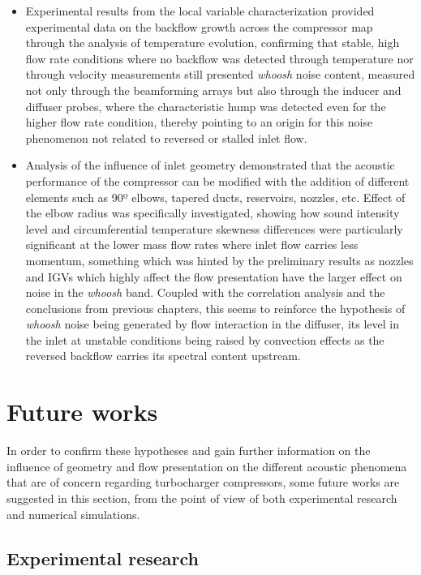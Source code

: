 \begin{itemize}
	\item Experimental results from the local variable characterization provided experimental data on the backflow growth across the compressor map through the analysis of temperature evolution, confirming that stable, high flow rate conditions where no backflow was detected through temperature nor through velocity measurements still presented \emph{whoosh} noise content, measured not only through the beamforming arrays but also through the inducer and diffuser probes, where the characteristic hump was detected even for the higher flow rate condition, thereby pointing to an origin for this noise phenomenon not related to reversed or stalled inlet flow.

	\item Analysis of the influence of inlet geometry demonstrated that the acoustic performance of the compressor can be modified with the addition of different elements such as 90º elbows, tapered ducts, reservoirs, nozzles, etc. Effect of the elbow radius was specifically investigated, showing how sound intensity level and circumferential temperature skewness differences were particularly significant at the lower mass flow rates where inlet flow carries less momentum, something which was hinted by the preliminary results as nozzles and IGVs which highly affect the flow presentation have the larger effect on noise in the \emph{whoosh} band. Coupled with the correlation analysis and the conclusions from previous chapters, this seems to reinforce the hypothesis of \emph{whoosh} noise being generated by flow interaction in the diffuser, its level in the inlet at unstable conditions being raised by convection effects as the reversed backflow carries its spectral content upstream.
\end{itemize}

\section{Future works}

In order to confirm these hypotheses and gain further information on the influence of geometry and flow presentation on the different acoustic phenomena that are of concern regarding turbocharger compressors, some future works are suggested in this section, from the point of view of both experimental research and numerical simulations.

\subsection{Experimental research}

